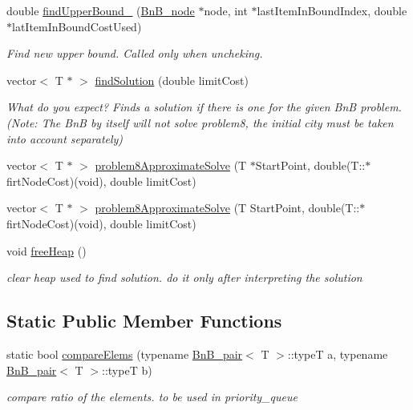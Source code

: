\begin{DoxyCompactItemize}
\item 
double \hyperlink{class_bn_b___u_p_a52efbfa978fd9b6c43e50da878862d93}{find\+Upper\+Bound\+\_} (\hyperlink{class_bn_b__node}{Bn\+B\+\_\+node} $\ast$node, int $\ast$last\+Item\+In\+Bound\+Index, double $\ast$lat\+Item\+In\+Bound\+Cost\+Used)
\begin{DoxyCompactList}\small\item\em Find new upper bound. Called only when uncheking. \end{DoxyCompactList}\item 
vector$<$ T $\ast$ $>$ \hyperlink{class_bn_b___u_p_a12c938cc252ed8b58018571f9debe90c}{find\+Solution} (double limit\+Cost)
\begin{DoxyCompactList}\small\item\em What do you expect? Finds a solution if there is one for the given Bn\+B problem. (Note\+: The Bn\+B by itself will not solve problem8, the initial city must be taken into account separately) \end{DoxyCompactList}\item 
vector$<$ T $\ast$ $>$ \hyperlink{class_bn_b___u_p_aa3f7bb7593bd68c64409405ce0137438}{problem8\+Approximate\+Solve} (T $\ast$Start\+Point, double(T\+::$\ast$firt\+Node\+Cost)(void), double limit\+Cost)
\item 
vector$<$ T $\ast$ $>$ \hyperlink{class_bn_b___u_p_ac37be727765647cb3907a9b183031ba8}{problem8\+Approximate\+Solve} (T Start\+Point, double(T\+::$\ast$firt\+Node\+Cost)(void), double limit\+Cost)
\item 
\hypertarget{class_bn_b___u_p_a2e70ca6c5bddb5467c7b45335922e9ae}{}void \hyperlink{class_bn_b___u_p_a2e70ca6c5bddb5467c7b45335922e9ae}{free\+Heap} ()\label{class_bn_b___u_p_a2e70ca6c5bddb5467c7b45335922e9ae}

\begin{DoxyCompactList}\small\item\em clear heap used to find solution. do it only after interpreting the solution \end{DoxyCompactList}\end{DoxyCompactItemize}
\subsection*{Static Public Member Functions}
\begin{DoxyCompactItemize}
\item 
\hypertarget{class_bn_b___u_p_a17570dfb1185be4ab8d1e651b7064ea5}{}static bool \hyperlink{class_bn_b___u_p_a17570dfb1185be4ab8d1e651b7064ea5}{compare\+Elems} (typename \hyperlink{struct_bn_b__pair}{Bn\+B\+\_\+pair}$<$ T $>$\+::type\+T a, typename \hyperlink{struct_bn_b__pair}{Bn\+B\+\_\+pair}$<$ T $>$\+::type\+T b)\label{class_bn_b___u_p_a17570dfb1185be4ab8d1e651b7064ea5}

\begin{DoxyCompactList}\small\item\em compare ratio of the elements. to be used in priority\+\_\+queue \end{DoxyCompactList}\end{DoxyCompactItemize}
